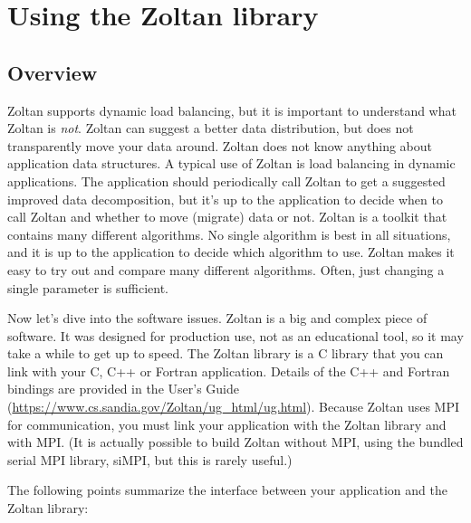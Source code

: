 %
% 
\chapter{Using the Zoltan library}
\label{cha:using}


\section{Overview}

Zoltan supports dynamic load balancing, but it is important 
to understand what Zoltan is \emph{not}. Zoltan can suggest
a better data distribution, but does not transparently move
your data around. Zoltan does not know anything about application
data structures. A typical use of Zoltan is 
load balancing in dynamic applications. The application
should periodically call Zoltan to get a suggested improved
data decomposition, but it's up to the application to
decide when to call Zoltan and whether to move (migrate) data or not.
Zoltan is a toolkit that contains many different algorithms.
No single algorithm is best in all situations, and it is
up to the application to decide which algorithm to use.
Zoltan makes it easy to try out and compare many different
algorithms. Often, just changing a single parameter is sufficient.

Now let's dive into the software issues. Zoltan is a big and complex 
piece of software. It was designed for production use, not as an educational 
tool, so it may take a while to get up to speed.
The Zoltan library is a C library that you can link with your C,
C++ or Fortran application.  Details of the C++ and Fortran bindings
are provided in the User's Guide 
(\url{https://www.cs.sandia.gov/Zoltan/ug_html/ug.html}).
Because Zoltan uses MPI for communication, you must link your application
with the Zoltan library and with MPI. (It is actually possible to build
Zoltan without MPI, using the bundled serial MPI library, siMPI,
but this is rarely useful.)

The following points summarize the interface between your
application and the Zoltan library:

